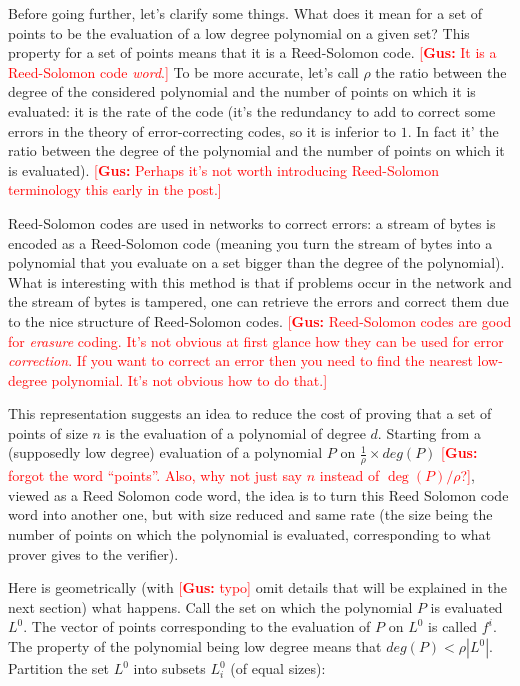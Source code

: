 \documentclass[12pt]{extarticle}
\newcommand{\<}{\langle}
\renewcommand{\>}{\rangle}
\theoremstyle{definition}
\newcommand{\gus}[1]{\textcolor{red}{[\textbf{Gus:} #1]}}
\begin{document}
Before going further, let's clarify some things. What does it mean for a set of points to be the evaluation of a low degree polynomial on a given set? This property for a set of points means that it is a Reed-Solomon code. \gus{It is a Reed-Solomon code \textit{word}.} To be more accurate, let's call $\rho$ the ratio between the degree of the considered polynomial and the number of points on which it is evaluated: it is the rate of the code (it's the redundancy to add to correct some errors in the theory of error-correcting codes, so it is inferior to $1$. In fact it' the ratio between the degree of the polynomial and the number of points on which it is evaluated).
\gus{Perhaps it's not worth introducing Reed-Solomon terminology this early in the post.}

Reed-Solomon codes are used in networks to correct errors: a stream of bytes is encoded as a Reed-Solomon code (meaning you turn the stream of bytes into a polynomial that you evaluate on a set bigger than the degree of the polynomial). What is interesting with this method is that if problems occur in the network and the stream of bytes is tampered, one can retrieve the errors and correct them due to the nice structure of Reed-Solomon codes.
\gus{Reed-Solomon codes are good for \textit{erasure} coding.  It's not obvious at first glance how they can be used for error \textit{correction}.  If you want to correct an error then you need to find the nearest low-degree polynomial.  It's not obvious how to do that.}

This representation suggests an idea to reduce the cost of proving that a set of points of size $n$ is the evaluation of a polynomial of degree $d$. Starting from a (supposedly low degree) evaluation of a polynomial $P$ on $\frac{1}{\rho}\times deg(P)$ \gus{forgot the word ``points''.  Also, why not just say $n$ instead of $\deg(P)/\rho$?}, viewed as a Reed Solomon code word, the idea is to turn this Reed Solomon code word into another one, but with size reduced and same rate (the size being the number of points on which the polynomial is evaluated, corresponding to what prover gives to the verifier).

Here is geometrically (with \gus{typo} omit details that will be explained in the next section) what happens. Call the set on which the polynomial $P$ is evaluated $L^0$. The vector of points corresponding to the evaluation of $P$ on $L^0$ is called $f^i$. The property of the polynomial being low degree means that $deg(P)<\rho |L^0|$. Partition the set $L^0$ into subsets $L^0_i$ (of equal sizes):
\end{document}
